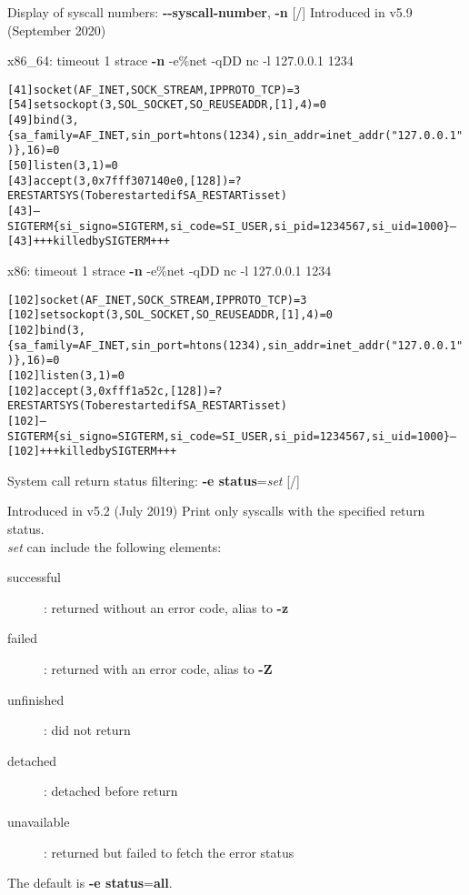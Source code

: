 \documentclass[unicode,aspectratio=169,xcolor={table,dvipsnames,usernames}]{beamer}
\begin{document}
\begin{frame}[fragile]{Display of syscall numbers: \textbf{-{}-syscall-number}, \textbf{-n} \hfill [\insertframenumber/\inserttotalframenumber]}
Introduced in v5.9 (September 2020)

\begin{block}{x86\_64: timeout 1 strace \textbf{-n} -e\%net -qDD nc -l 127.0.0.1 1234}
\scriptsize
\begin{alltt}
[  41] socket(AF_INET, SOCK_STREAM, IPPROTO_TCP) = 3
[  54] setsockopt(3, SOL_SOCKET, SO_REUSEADDR, [1], 4) = 0
[  49] bind(3, \{sa_family=AF_INET, sin_port=htons(1234), sin_addr=inet_addr("127.0.0.1")\}, 16) = 0
[  50] listen(3, 1)                     = 0
[  43] accept(3, 0x7fff307140e0, [128]) = ? ERESTARTSYS (To be restarted if SA_RESTART is set)
[  43] --- SIGTERM \{si_signo=SIGTERM, si_code=SI_USER, si_pid=1234567, si_uid=1000\} ---
[  43] +++ killed by SIGTERM +++
\end{alltt}
\end{block}

\begin{block}{x86: timeout 1 strace \textbf{-n} -e\%net -qDD nc -l 127.0.0.1 1234}
\scriptsize
\begin{alltt}
[ 102] socket(AF_INET, SOCK_STREAM, IPPROTO_TCP) = 3
[ 102] setsockopt(3, SOL_SOCKET, SO_REUSEADDR, [1], 4) = 0
[ 102] bind(3, \{sa_family=AF_INET, sin_port=htons(1234), sin_addr=inet_addr("127.0.0.1")\}, 16) = 0
[ 102] listen(3, 1)                     = 0
[ 102] accept(3, 0xfff1a52c, [128])     = ? ERESTARTSYS (To be restarted if SA_RESTART is set)
[ 102] --- SIGTERM \{si_signo=SIGTERM, si_code=SI_USER, si_pid=1234567, si_uid=1000\} ---
[ 102] +++ killed by SIGTERM +++
\end{alltt}
\end{block}
\end{frame}

\begin{frame}{System call return status filtering: \textbf{-e status}=\textit{set} \hfill [\insertframenumber/\inserttotalframenumber]}
\Large
\begin{block}{Introduced in v5.2 (July 2019)}
\large
Print only syscalls with the specified return status. \\
\textit{set} can include the following elements:
\begin{description}
	\item[successful]: returned without an error code, alias to \textbf{-z}
	\item[failed]: returned with an error code, alias to \textbf{-Z}
	\item[unfinished]: did not return
	\item[detached]: detached before return
	\item[unavailable]: returned but failed to fetch the error status
\end{description}
\end{block}
The default is \textbf{-e status}=\textbf{all}.
\end{frame}
\end{document}
